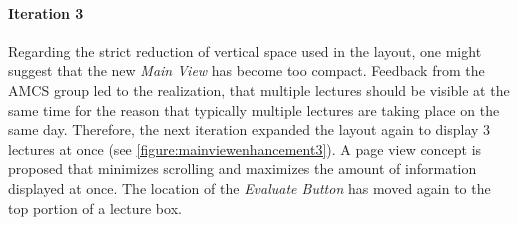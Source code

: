 \paragraph{Iteration 3}
Regarding the strict reduction of vertical space used in the layout, one might suggest that the new \emph{Main View} has become too compact.
Feedback from the AMCS group led to the realization, that multiple lectures should be visible at the same time for the reason that typically multiple lectures are taking place on the same day.
Therefore, the next iteration expanded the layout again to display 3 lectures at once (see \autoref{figure:mainviewenhancement3}). A page view concept is proposed that minimizes scrolling and maximizes the amount of information displayed at once. The location of the \emph{Evaluate Button} has moved again to the top portion of a lecture box.

